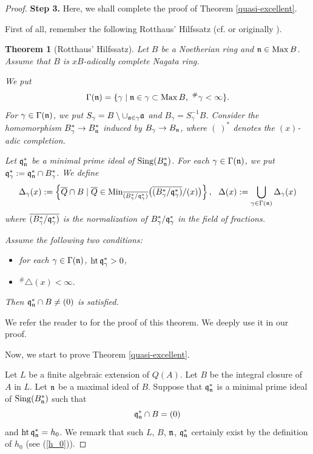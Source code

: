\documentclass[11pt,a4paper]{amsart}
\newtheorem{theorem}{Theorem}[section]
\theoremstyle{definition}
\theoremstyle{remark}
\newcommand{\Ht}{\operatorname{ht}}
\newcommand{\Max}{\operatorname{Max}}
\newcommand{\Sing}{\operatorname{Sing}}
\newcommand{\fq}{\frak{q}}
\newcommand{\fa}{\frak{a}}
\newcommand{\fn}{\frak{n}}
\begin{document}
\begin{proof}
\noindent
{\bf Step 3.}
Here, we shall complete the proof of Theorem \ref{quasi-excellent}.

First of all, remember  the following Rotthaus' Hilfssatz (cf. \cite[Theorem 1.9 and Proposition 1.18]{Nishimura87} or originally \cite{Rott80}).

\begin{theorem}[Rotthaus' Hilfssatz]
\label{Rotthaus' Hilfssatz}
Let $B$ be a Noetherian ring and $\fn \in \Max B$.
Assume that $B$ is $xB$-adically complete Nagata ring.

We put
\[
\Gamma(\fn) = \{ \gamma  \mid \fn \in \gamma \subset \Max B, \ {}^\#\gamma < \infty \} .
\]
For $\gamma \in \Gamma(\fn)$, we put $S_\gamma = B \setminus \cup_{\fa \in \gamma}\fa$ and $B_\gamma = S_\gamma^{-1}B$. Consider the homomorphism $B_\gamma^* \rightarrow B_\fn^*$ induced by $B_\gamma \rightarrow B_\fn$, where $( \ )^*$ denotes the $(x)$-adic completion.

Let $\fq_\fn^*$ be a minimal prime ideal of $\Sing(B_\fn^*)$.
For each $\gamma \in \Gamma(\fn)$, we put 
$\fq_\gamma^*:=\fq_\fn^* \cap B_\gamma^*$. We define
\[
\Delta_\gamma(x):=\left\{ 
\overline{Q} \cap B \mid
\overline{Q} \in {\rm Min}_{\overline{(B_\gamma^*/\fq_\gamma^*)}}
\big(\overline{(B_\gamma^*/\fq_\gamma^*)}/(x)\big)
\right\} , \ \ \Delta(x):=\bigcup_{\gamma \in \Gamma(\fn)} \Delta_\gamma(x)
\]
where $\overline{(B_\gamma^*/\fq_\gamma^*)}$ is the normalization of $B_\gamma^*/\fq_\gamma^*$ in the field of fractions.

Assume the following two conditions:
\begin{itemize}
\item[(i)]
for each $\gamma \in \Gamma(\fn)$, $\Ht \fq_\gamma^* > 0$,
\item[(ii)]
${}^\# \triangle (x) < \infty$.
\end{itemize}

Then $\fq_\fn^* \cap B \neq (0)$ is satisfied.
\end{theorem}

We refer the reader to \cite{Nishimura87} for the proof of this theorem. We deeply use it in our proof.

\vspace{1mm}

Now, we start to prove Theorem \ref{quasi-excellent}.

Let $L$ be a finite algebraic extension of $Q(A)$. Let $B$ be the integral closure of $A$ in $L$. Let $\fn$ be a maximal ideal of $B$. Suppose that $\fq_{\fn}^*$ is a minimal prime ideal of ${\rm Sing}(B_\fn^*)$ such that 
\begin{equation}\label{intersection}
\fq_{\fn}^* \cap B=(0)
\end{equation}
 and $\Ht \fq_{\fn}^*=h_0$.
We remark that such $L$, $B$, $\fn$, $\fq_\fn^*$ certainly exist by the definition of $h_0$ (see (\ref{h_0})).


\end{proof}
\end{document}
